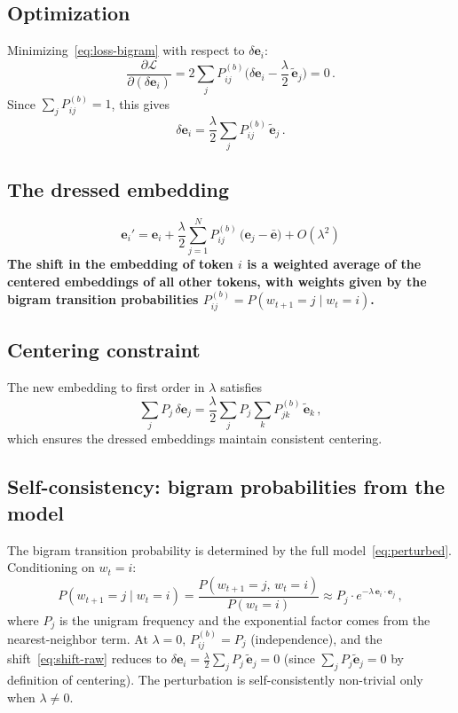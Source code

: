 \documentclass[11pt]{article}
\newcommand{\ee}{\bm{e}}
\begin{document}
\subsection{Optimization}

Minimizing~\eqref{eq:loss-bigram} with respect to $\delta\ee_i$:
\begin{equation}
    \frac{\partial \mathcal{L}}{\partial(\delta\ee_i)} = 2\sum_j P_{ij}^{(b)} \Big(\delta\ee_i - \frac{\lambda}{2}\, \tilde{\ee}_j\Big) = 0\,.
\end{equation}
Since $\sum_j P_{ij}^{(b)} = 1$, this gives
\begin{equation}\label{eq:shift-raw}
    \delta\ee_i = \frac{\lambda}{2} \sum_j P_{ij}^{(b)}\, \tilde{\ee}_j\,.
\end{equation}

\subsection{The dressed embedding}

\begin{equation}\label{eq:main-result}
    \boxed{\;\ee_i' = \ee_i + \frac{\lambda}{2} \sum_{j=1}^{N} P_{ij}^{(b)}\, \big(\ee_j - \bar{\ee}\big) + O(\lambda^2)\;}
\end{equation}
\textbf{The shift in the embedding of token $i$ is a weighted average of the centered embeddings of all other tokens, with weights given by the bigram transition probabilities $P_{ij}^{(b)} = P(w_{t+1} = j \mid w_t = i)$.}

\subsection{Centering constraint}

The new embedding to first order in $\lambda$ satisfies
\begin{equation}
    \sum_j P_j\, \delta\ee_j = \frac{\lambda}{2} \sum_j P_j \sum_k P_{jk}^{(b)}\, \tilde{\ee}_k\,,
\end{equation}
which ensures the dressed embeddings maintain consistent centering.

\subsection{Self-consistency: bigram probabilities from the model}

The bigram transition probability is determined by the full model~\eqref{eq:perturbed}. Conditioning on $w_t = i$:
\begin{equation}\label{eq:bigram-self}
    P(w_{t+1} = j \mid w_t = i) = \frac{P(w_{t+1} = j,\, w_t = i)}{P(w_t = i)} \approx P_j \cdot e^{-\lambda\, \ee_i \cdot \ee_j}\,,
\end{equation}
where $P_j$ is the unigram frequency and the exponential factor comes from the nearest-neighbor term. At $\lambda = 0$, $P_{ij}^{(b)} = P_j$ (independence), and the shift~\eqref{eq:shift-raw} reduces to $\delta\ee_i = \frac{\lambda}{2}\sum_j P_j\, \tilde{\ee}_j = 0$ (since $\sum_j P_j \tilde{\ee}_j = 0$ by definition of centering). The perturbation is self-consistently non-trivial only when $\lambda \neq 0$.
\end{document}
